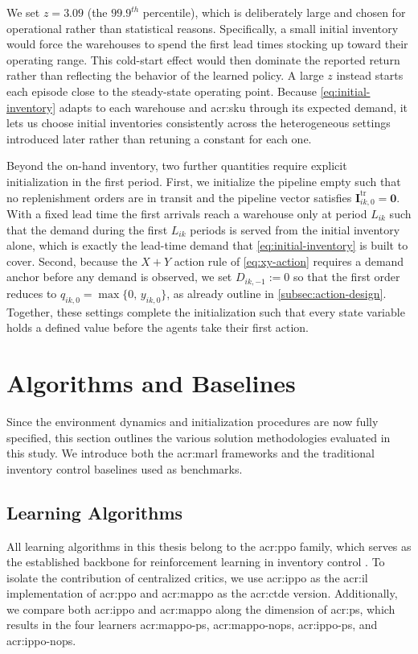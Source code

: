 We set $z = 3.09$ (the $99.9^{th}$ percentile), which is deliberately large and chosen for operational rather than statistical reasons. Specifically, a small initial inventory would force the warehouses to spend the first lead times stocking up toward their operating range. This cold-start effect would then dominate the reported return rather than reflecting the behavior of the learned policy. A large $z$ instead starts each episode close to the steady-state operating point. Because \autoref{eq:initial-inventory} adapts to each warehouse and \gls{acr:sku} through its expected demand, it lets us choose initial inventories consistently across the heterogeneous settings introduced later rather than retuning a constant for each one.

Beyond the on-hand inventory, two further quantities require explicit initialization in the first period. First, we initialize the pipeline empty such that no replenishment orders are in transit and the pipeline vector satisfies $\mathbf{I}^{\mathrm{tr}}_{ik,0} = \mathbf{0}$. With a fixed lead time the first arrivals reach a warehouse only at period $L_{ik}$ such that the demand during the first $L_{ik}$ periods is served from the initial inventory alone, which is exactly the lead-time demand that \autoref{eq:initial-inventory} is built to cover. Second, because the $X+Y$ action rule of \autoref{eq:xy-action} requires a demand anchor before any demand is observed, we set $D_{ik,-1} := 0$ so that the first order reduces to $q_{ik,0} = \max\{0,\,y_{ik,0}\}$, as already outline in \autoref{subsec:action-design}. Together, these settings complete the initialization such that every state variable holds a defined value before the agents take their first action. \\


\section{Algorithms and Baselines}
\label{sec:algorithms-and-baselines}

Since the environment dynamics and initialization procedures are now fully specified, this section outlines the various solution methodologies evaluated in this study. We introduce both the \gls{acr:marl} frameworks and the traditional inventory control baselines used as benchmarks.\\

\subsection{Learning Algorithms}
\label{subsec:learning-algorithms}
All learning algorithms in this thesis belong to the \gls{acr:ppo} family, which serves as the established backbone for reinforcement learning in inventory control \citep{schulman2017}. To isolate the contribution of centralized critics, we use \Gls{acr:ippo} \citep{dewitt2020independent} as the \gls{acr:il} implementation of \gls{acr:ppo} and \gls{acr:mappo} \citep{yu2022surprising} as the \gls{acr:ctde} version. Additionally, we compare both \gls{acr:ippo} and \gls{acr:mappo} along the dimension of \gls{acr:ps}, which results in the four learners \gls{acr:mappo-ps}, \gls{acr:mappo-nops}, \gls{acr:ippo-ps}, and \gls{acr:ippo-nops}. 

